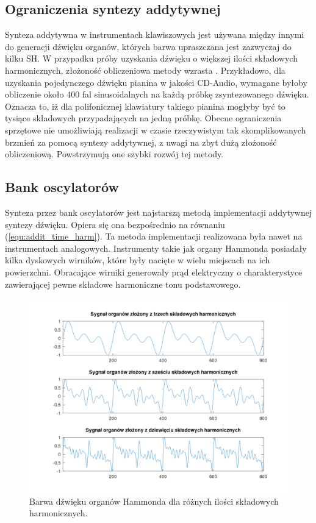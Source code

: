 \subsection{Ograniczenia syntezy addytywnej} \label{addit_ograniczenia}
Synteza addytywna w instrumentach klawiszowych jest używana między innymi do generacji dźwięku organów, których barwa upraszczana jest zazwyczaj do kilku SH. W przypadku próby uzyskania dźwięku o większej ilości składowych harmonicznych, złożoność obliczeniowa metody wzrasta \cite{add_ograniczenia}.
Przykładowo, dla uzyskania pojedynczego dźwięku pianina w jakości CD-Audio,
wymagane byłoby obliczenie około 400 fal sinusoidalnych na każdą próbkę zsyntezowanego dźwięku. Oznacza to, iż dla polifonicznej klawiatury takiego pianina mogłyby być to tysiące składowych przypadających na jedną próbkę. Obecne ograniczenia sprzętowe nie umożliwiają realizacji w czasie rzeczywistym tak skomplikowanych brzmień za pomocą syntezy addytywnej, z uwagi na zbyt dużą złożoność obliczeniową. Powstrzymują one szybki rozwój tej metody.

\subsection{Bank oscylatorów}
Synteza przez bank oscylatorów jest najstarszą metodą implementacji addytywnej syntezy dźwięku. Opiera się ona bezpośrednio na równaniu (\ref{equ:addit_time_harm}).
Ta metoda implementacji realizowana była nawet na instrumentach analogowych. Instrumenty takie jak organy Hammonda posiadały kilka dyskowych wirników, które były nacięte w wielu miejscach na ich powierzchni. Obracające wirniki generowały prąd elektryczny o charakterystyce zawierającej pewne składowe harmoniczne tonu podstawowego.
\begin{figure}[H]
	\centering
	\includegraphics[width=15cm]{grafiki/add_hammond_matlab}
	\captionsetup{justification=centering}
	\caption{Barwa dźwięku organów Hammonda dla różnych ilości składowych harmonicznych.}
	\label{rys:add_hammond_matlab}
\end{figure}

